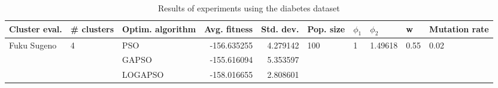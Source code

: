 \begin{table}
\centering
\caption{Results of experiments using the diabetes dataset}
\begin{tabular}{lllrrlllll}
\toprule
               Cluster eval. &        \# clusters & Optim. algorithm &  Avg. fitness &  Std. dev. &            Pop. size &         $\phi_{1}$ &               $\phi_{2}$ &                     w &         Mutation rate \\
\midrule
\multirow{3}{*}{Fuku Sugeno} & \multirow{3}{*}{4} &              PSO &   -156.635255 &   4.279142 & \multirow{3}{*}{100} & \multirow{3}{*}{1} & \multirow{3}{*}{1.49618} & \multirow{3}{*}{0.55} & \multirow{3}{*}{0.02} \\
                             &                    &            GAPSO &   -155.616094 &   5.353597 &                      &                    &                          &                       &                       \\
                             &                    &          LOGAPSO &   -158.016655 &   2.808601 &                      &                    &                          &                       &                       \\
\bottomrule
\end{tabular}
\end{table}
